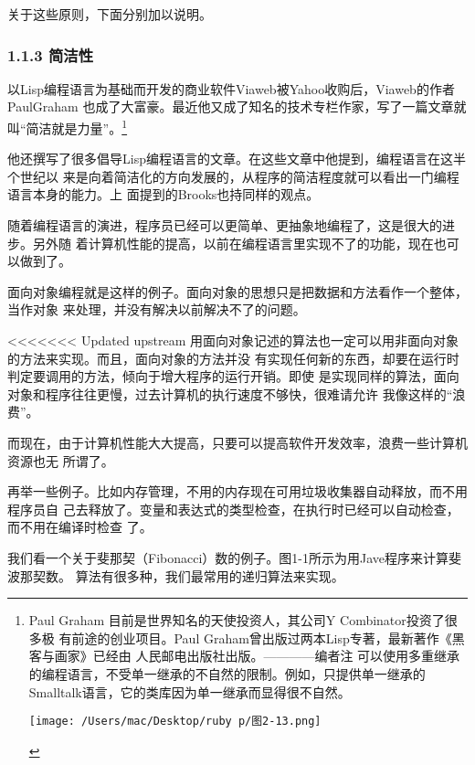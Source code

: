 \documentclass[11pt]{ctexart}
\begin{document}
关于这些原则，下面分别加以说明。

\subsubsection{1.1.3 简洁性}
\label{sec:orgd2f49c5}

以Lisp编程语言为基础而开发的商业软件Viaweb被Yahoo收购后，Viaweb的作者PaulGraham
也成了大富豪。最近他又成了知名的技术专栏作家，写了一篇文章就叫“简洁就是力量”。\footnote{Paul Graham 目前是世界知名的天使投资人，其公司Y Combinator投资了很多极
有前途的创业项目。Paul Graham曾出版过两本Lisp专著，最新著作《黑客与画家》已经由
人民邮电出版社出版。————编者注
可以使用多重继承的编程语言，不受单一继承的不自然的限制。例如，只提供单一继承的
Smalltalk语言，它的类库因为单一继承而显得很不自然。
\begin{center}
\texttt{[image: /Users/mac/Desktop/ruby p/图2-13.png]}
\end{center}}

他还撰写了很多倡导Lisp编程语言的文章。在这些文章中他提到，编程语言在这半个世纪以
来是向着简洁化的方向发展的，从程序的简洁程度就可以看出一门编程语言本身的能力。上
面提到的Brooks也持同样的观点。

随着编程语言的演进，程序员已经可以更简单、更抽象地编程了，这是很大的进步。另外随
着计算机性能的提高，以前在编程语言里实现不了的功能，现在也可以做到了。

面向对象编程就是这样的例子。面向对象的思想只是把数据和方法看作一个整体，当作对象
来处理，并没有解决以前解决不了的问题。

<<<<<<< Updated upstream
  用面向对象记述的算法也一定可以用非面向对象的方法来实现。而且，面向对象的方法并没
  有实现任何新的东西，却要在运行时判定要调用的方法，倾向于增大程序的运行开销。即使
  是实现同样的算法，面向对象和程序往往更慢，过去计算机的执行速度不够快，很难请允许
  我像这样的“浪费”。

而现在，由于计算机性能大大提高，只要可以提高软件开发效率，浪费一些计算机资源也无
所谓了。

再举一些例子。比如内存管理，不用的内存现在可用垃圾收集器自动释放，而不用程序员自
己去释放了。变量和表达式的类型检查，在执行时已经可以自动检查，而不用在编译时检查
了。

我们看一个关于斐那契（Fibonacci）数的例子。图1-1所示为用Jave程序来计算斐波那契数。
算法有很多种，我们最常用的递归算法来实现。
\end{document}
